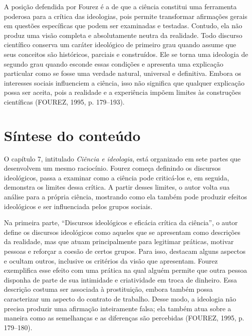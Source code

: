 \documentclass[12pt,a4paper]{article}
\begin{document}
A posição defendida por Fourez é a de que a ciência constitui uma ferramenta
poderosa para a crítica das ideologias, pois permite transformar afirmações
gerais em questões específicas que podem ser examinadas e testadas. Contudo,
ela não produz uma visão completa e absolutamente neutra da realidade. Todo
discurso científico conserva um caráter ideológico de primeiro grau quando
assume que seus conceitos são históricos, parciais e construídos. Ele se
torna uma ideologia de segundo grau quando esconde essas condições e
apresenta uma explicação particular como se fosse uma verdade natural,
universal e definitiva. Embora os interesses sociais influenciem a ciência,
isso não significa que qualquer explicação possa ser aceita, pois a
realidade e a experiência impõem limites às construções científicas
(FOUREZ, 1995, p. 179--193).

\section*{Síntese do conteúdo}

O capítulo 7, intitulado \textit{Ciência e ideologia}, está organizado em
sete partes que desenvolvem um mesmo raciocínio. Fourez começa definindo os
discursos ideológicos, passa a examinar como a ciência pode criticá-los e,
em seguida, demonstra os limites dessa crítica. A partir desses limites, o
autor volta sua análise para a própria ciência, mostrando como ela também
pode produzir efeitos ideológicos e ser influenciada pelos grupos sociais.

Na primeira parte, ``Discursos ideológicos e eficácia crítica da ciência'',
o autor define os discursos ideológicos como aqueles que se apresentam como
descrições da realidade, mas que atuam principalmente para legitimar
práticas, motivar pessoas e reforçar a coesão de certos grupos. Para isso,
destacam alguns aspectos e ocultam outros, inclusive os critérios da visão
que apresentam. Fourez exemplifica esse efeito com uma prática na qual
alguém permite que outra pessoa disponha de parte de sua intimidade e
criatividade em troca de dinheiro. Essa descrição costuma ser associada à
prostituição, embora também possa caracterizar um aspecto do contrato de
trabalho. Desse modo, a ideologia não precisa produzir uma afirmação
inteiramente falsa; ela também atua sobre a maneira como as semelhanças e as
diferenças são percebidas (FOUREZ, 1995, p. 179--180).
\end{document}
